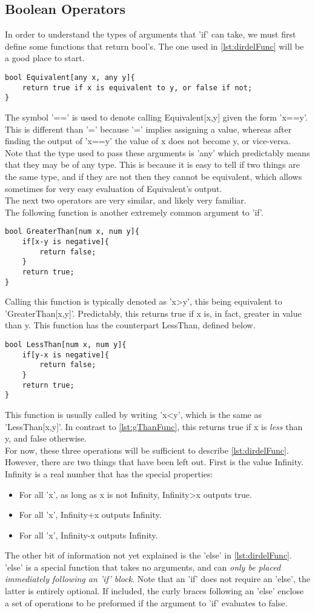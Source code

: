 \subsection{Boolean Operators}
In order to understand the types of arguments that 'if' can take, we must first define some functions that return bool's. The one used in \ref{lst:dirdelFunc} will be a good place to start.
\begin{verbatim}
bool Equivalent[any x, any y]{
	return true if x is equivalent to y, or false if not;
}
\end{verbatim}
The symbol '==' is used to denote calling Equivalent[x,y] given the form 'x==y'. This is different than '=' because '=' implies assigning a value, whereas after finding the output of 'x==y' the value of x does not become y, or vice-versa. Note that the type used to pass these arguments is 'any' which predictably means that they may be of any type. This is because it is easy to tell if two things are the same type, and if they are not then they cannot be equivalent, which allows sometimes for very easy evaluation of Equivalent's output. \\
The next two operators are very similar, and likely very familiar. \\
The following function is another extremely common argument to 'if'.
\begin{verbatim}
bool GreaterThan[num x, num y]{
	if[x-y is negative]{
		return false;
	}
	return true;
}
\end{verbatim}
Calling this function is typically denoted as 'x>y', this being equivalent to 'GreaterThan[x,y]'. Predictably, this returns true if x is, in fact, greater in value than y. This function has the counterpart LessThan, defined below.
\begin{verbatim}
bool LessThan[num x, num y]{
	if[y-x is negative]{
		return false;
	}
	return true;
}
\end{verbatim}
This function is usually called by writing 'x<y', which is the same as 'LessThan[x,y]'. In contrast to \ref{lst:gThanFunc}, this returns true if x is \emph{less} than y, and false otherwise. \\
For now, these three operations will be sufficient to describe \ref{lst:dirdelFunc}. However, there are two things that have been left out. First is the value Infinity. Infinity is a real number that has the special properties:
\begin{itemize}
\item For all 'x', as long as x is not Infinity, Infinity>x outputs true.
\item For all 'x', Infinity+x outputs Infinity.
\item For all 'x', Infinity-x outputs Infinity.
\end{itemize}
The other bit of information not yet explained is the 'else' in \ref{lst:dirdelFunc}. 'else' is a special function that takes no arguments, and can \emph{only be placed immediately following an 'if' block}. Note that an 'if' does not require an 'else', the latter is entirely optional. If included, the curly braces following an 'else' enclose a set of operations to be preformed if the argument to 'if' evaluates to false.

